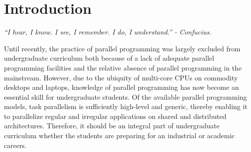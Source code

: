 \documentclass[9pt,twocolumn,letter]{article}
\begin{document}
\section{Introduction}
\begin{center}
\small{\textit{``I hear, I know. I see, I remember. I do, I understand.'' -
Confucius.}}
\end{center}
%
Until recently, the practice of parallel programming was largely excluded 
from undergraduate curriculum both because of a lack of adequate parallel
programming facilities and the relative absence of parallel programming 
in the mainstream.
%
However, due to the ubiquity of multi-core CPUs on commodity desktops and
laptops, knowledge of parallel programming has now become an essential skill
for undergraduate students. 
%
% 
%
Of the available parallel programming models, task parallelism is sufficiently
high-level and generic, thereby enabling it to parallelize regular and
irregular applications on shared and distributed architectures.  
%
Therefore, it should be an integral part of undergraduate curriculum whether
the students are preparing for an industrial or academic careers.
\end{document}
